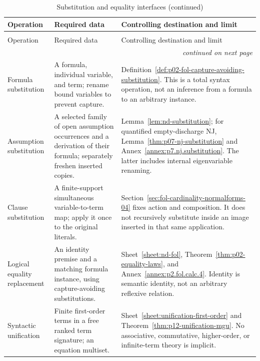 \begingroup\small
\begin{longtable}{@{}p{}p{}p{}@{}}
\caption{Substitution and equality interfaces.}
\label{tab:p14-classical-calculi-substitution}\\
\toprule
Operation & Required data & Controlling destination and limit \\
\midrule
\endfirsthead
\caption[]{Substitution and equality interfaces (continued)}\\
\toprule
Operation & Required data & Controlling destination and limit \\
\midrule
\endhead
\midrule\multicolumn{3}{r}{\emph{continued on next page}}\\
\endfoot
\endlastfoot
Formula substitution & A formula, individual variable, and term; rename
bound variables to prevent capture. &
Definition~\ref{def:p02-fol-capture-avoiding-substitution}.  This is a total
syntax operation, not an inference from a formula to an arbitrary instance. \\
Assumption substitution & A selected family of open assumption occurrences
and a derivation of their formula; separately freshen inserted copies. &
Lemma~\ref{lem:nd-substitution}; for quantified empty-discharge NJ,
Lemma~\ref{thm:p07-nj-substitution} and Annex~\ref{annex:p7.nj.substitution}.
The latter includes internal eigenvariable renaming. \\
Clause substitution & A finite-support simultaneous variable-to-term map;
apply it once to the original literals. &
Section~\ref{sec:fol-cardinality-normalforms-04} fixes action and composition.
It does not recursively substitute inside an image inserted in that same
application. \\
Logical equality replacement & An identity premise and a matching formula
instance, using capture-avoiding substitutions. &
Sheet~\ref{sheet:nd-fol}, Theorem~\ref{thm:p02-equality-laws}, and
Annex~\ref{annex:p2.fol.calc.4}.  Identity is semantic identity, not an
arbitrary reflexive relation. \\
Syntactic unification & Finite first-order terms in a free ranked term
signature; an equation multiset. &
Sheet~\ref{sheet:unification-first-order} and
Theorem~\ref{thm:p12-unification-mgu}.  No associative, commutative,
higher-order, or infinite-term theory is implicit. \\
\bottomrule
\end{longtable}
\endgroup

